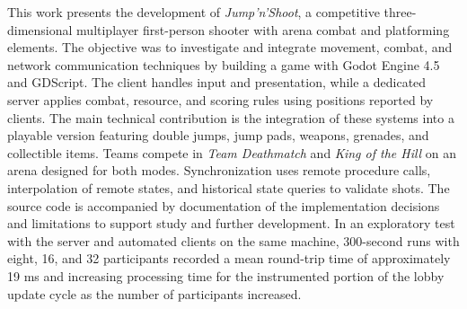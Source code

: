 \begin{abstractutfpr}
This work presents the development of \textit{Jump'n'Shoot}, a competitive three-dimensional multiplayer first-person shooter with arena combat and platforming elements. The objective was to investigate and integrate movement, combat, and network communication techniques by building a game with Godot Engine 4.5 and GDScript. The client handles input and presentation, while a dedicated server applies combat, resource, and scoring rules using positions reported by clients. The main technical contribution is the integration of these systems into a playable version featuring double jumps, jump pads, weapons, grenades, and collectible items. Teams compete in \textit{Team Deathmatch} and \textit{King of the Hill} on an arena designed for both modes. Synchronization uses remote procedure calls, interpolation of remote states, and historical state queries to validate shots. The source code is accompanied by documentation of the implementation decisions and limitations to support study and further development. In an exploratory test with the server and automated clients on the same machine, 300-second runs with eight, 16, and 32 participants recorded a mean round-trip time of approximately 19 ms and increasing processing time for the instrumented portion of the lobby update cycle as the number of participants increased.
\end{abstractutfpr}
